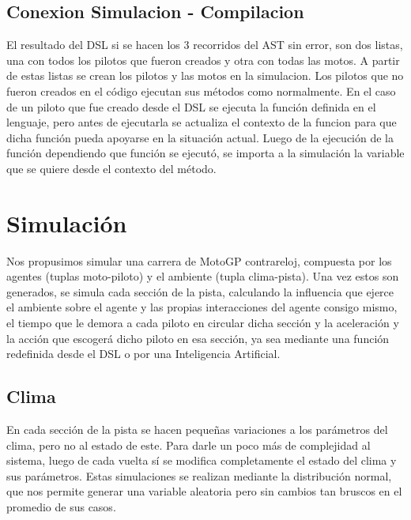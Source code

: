 \documentclass[12pt, letterpaper,spanish]{article}
\theoremstyle{definition}
\theoremstyle{remark}
\begin{document}
	\subsection{Conexion Simulacion - Compilacion}
	
	El resultado del DSL si se hacen los 3 recorridos del AST sin error, son dos listas, una con todos los pilotos que fueron creados y otra con todas las motos. A partir de estas listas se crean los pilotos y las motos en la simulacion. Los pilotos que no fueron creados en el código ejecutan sus métodos como normalmente. En el caso de un piloto que fue creado desde el DSL se ejecuta la función definida en el lenguaje, pero antes de ejecutarla se actualiza el contexto de la funcion para que dicha función pueda apoyarse en la situación actual. Luego de la ejecución de la función dependiendo que función se ejecutó, se importa a la simulación la variable que se quiere desde el contexto del método. 		
	
	
\section{Simulación}\cite{conferenciasS}\cite{garcia}
	Nos propusimos simular una carrera de MotoGP contrareloj, compuesta por los agentes (tuplas moto-piloto) y el ambiente (tupla clima-pista). Una vez estos son generados, se simula cada sección de la pista, calculando la influencia que ejerce el ambiente sobre el agente y las propias interacciones del agente consigo mismo, el tiempo que le demora a cada piloto en circular dicha sección y la aceleración y la acción que escogerá dicho piloto en esa sección, ya sea mediante una función redefinida desde el DSL o por una Inteligencia Artificial.
	
	\subsection{Clima}
	En cada sección de la pista se hacen pequeñas variaciones a los parámetros del clima, pero no al estado de este. Para darle un poco más de complejidad al sistema, luego de cada vuelta sí se modifica completamente el estado del clima y sus parámetros. Estas simulaciones se realizan mediante la distribución normal, que nos permite generar una variable aleatoria pero sin cambios tan bruscos en el promedio de sus casos.
	
\end{document}
